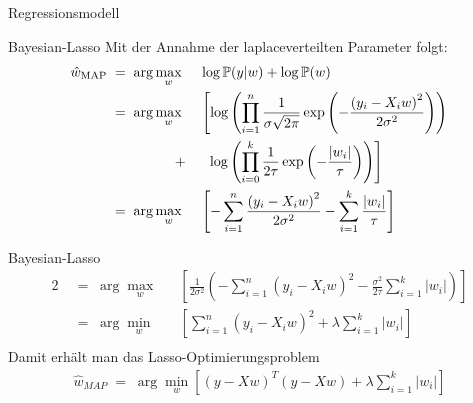 \documentclass{beamer}
\begin{document}
{\begin{frame}{Regressionsmodell}
\end{frame}

\begin{frame}{Bayesian-Lasso}
	Mit der Annahme der laplaceverteilten Parameter folgt:
	\begin{alignat}{2}
		\hat{w}_{\text{MAP}}&\;=\;\arg\underset{w}{\max}&& \log\mathbb{P}(y\vert w) + \log \mathbb{P}(w) \\
		&\;=\;\arg\underset{w}{\max}&&\left[\log\left(\prod_{i=1}^{n}\frac{1}{\sigma\sqrt{2\pi}}\exp\left(-\frac{\left(y_i-X_iw\right)^2}{2\sigma^2}\right)\right)\right.\\	&\hspace{1,7cm}+&&\:\:\left.\log\left(\prod_{i=0}^{k}\frac{1}{2\tau}\exp\left(-\frac{\left|w_i\right|}{\tau}\right)\right)\right]\\
		&\;=\;\arg\underset{w}{\max} && \left[-\sum_{i=1}^{n}\frac{\left(y_i-X_iw\right)^2}{2\sigma^2}-\sum_{i=1}^{k}\frac{\left|w_i\right|}{\tau}\right]\\
	\end{alignat}
\end{frame}

\begin{frame}{Bayesian-Lasso}
	\begin{alignat}{2}
		&\;=\;\arg\underset{w}{\max} && \left[\frac{1}{2\sigma^2}\left(-\sum_{i=1}^{n}\left(y_i-X_iw\right)^2-\frac{\sigma^2}{2\tau}\sum_{i=1}^{k}\left|w_i\right|\right)\right]\\
		&\;=\;\arg\underset{w}{\min} && \left[\sum_{i=1}^{n}\left(y_i-X_iw\right)^2+\lambda\sum_{i=1}^{k}\left|w_i\right|\right] \\
	\end{alignat}
	Damit erhält man das Lasso-Optimierungsproblem
	\begin{align}
		\hat{w}_{MAP}\;=\;\arg\underset{w}{\min}\left[\left(y-Xw\right)^T\left(y-Xw\right)+\lambda\sum_{i=1}^{k}\left|w_i\right|\right]
	\end{align}
\end{frame}

}
\end{document}
